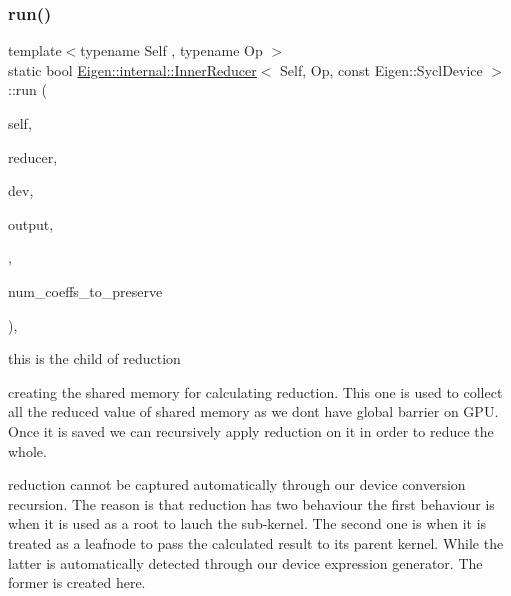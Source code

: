 \mbox{\label{struct_eigen_1_1internal_1_1_inner_reducer_3_01_self_00_01_op_00_01const_01_eigen_1_1_sycl_device_01_4_a471bb175078f166e0d5c4040fc4494d9}} 
\subsubsection{\texorpdfstring{run()}{run()}\hspace{0.1cm}{\footnotesize\ttfamily [2/2]}}
{\footnotesize\ttfamily template$<$typename Self , typename Op $>$ \\
static bool \hyperlink{struct_eigen_1_1internal_1_1_inner_reducer}{Eigen\+::internal\+::\+Inner\+Reducer}$<$ Self, Op, const Eigen\+::\+Sycl\+Device $>$\+::run (\begin{DoxyParamCaption}\item[{const Self \&}]{self,  }\item[{Op \&}]{reducer,  }\item[{const Eigen\+::\+Sycl\+Device \&}]{dev,  }\item[{Coeff\+Return\+Type $\ast$}]{output,  }\item[{typename Self\+::\+Index}]{,  }\item[{typename Self\+::\+Index}]{num\+\_\+coeffs\+\_\+to\+\_\+preserve }\end{DoxyParamCaption})\hspace{0.3cm}{\ttfamily [inline]}, {\ttfamily [static]}}

this is the child of reduction

creating the shared memory for calculating reduction. This one is used to collect all the reduced value of shared memory as we dont have global barrier on G\+PU. Once it is saved we can recursively apply reduction on it in order to reduce the whole.

reduction cannot be captured automatically through our device conversion recursion. The reason is that reduction has two behaviour the first behaviour is when it is used as a root to lauch the sub-\/kernel. The second one is when it is treated as a leafnode to pass the calculated result to its parent kernel. While the latter is automatically detected through our device expression generator. The former is created here.

